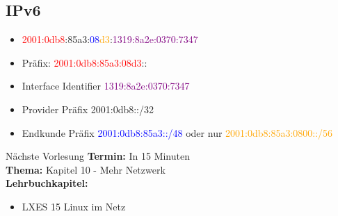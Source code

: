 \documentclass[aspectratio=43]{beamer}
\begin{document}
\subsection{IPv6}
\begin{frame} 
	\begin{block}{} 
	\begin{itemize}
	\item \textcolor{red}{2001:0db8}:\textcolor{green!50!black}{85a3}:\textcolor{blue}{08}\textcolor{orange}{d3}:\textcolor{purple}{1319:8a2e:0370:7347}
	\item Präfix: \textcolor{red}{2001:0db8:85a3:08d3}::
	\item Interface Identifier \textcolor{purple}{1319:8a2e:0370:7347}
	\item Provider Präfix \textcolor{green!50!black}{2001:0db8::/32}
	\item Endkunde Präfix    \textcolor{blue}{2001:0db8:85a3::/48} oder nur \textcolor{orange}{2001:0db8:85a3:0800::/56} 
	\end{itemize}
	\end{block}
\end{frame}


\begin{frame}[plain]
\begin{alertblock}{Nächste Vorlesung}
\textbf{Termin:} In 15 Minuten\\
\textbf{Thema:} Kapitel 10 - Mehr Netzwerk \\
\textbf{Lehrbuchkapitel:} 
\begin{itemize}
\item LXES 15 Linux im Netz 
\end{itemize}
\end{alertblock}
\end{frame}

\materialframe
\versionframe
\end{document}
